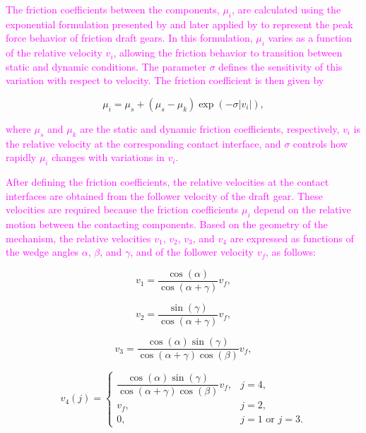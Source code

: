 \documentclass[preprint,10pt]{elsarticle}
\begin{document}
\textcolor{Magenta}{The friction coefficients between the components, $\mu_i$, are calculated using the exponential formulation presented by \cite{berger2002friction} and later applied by \cite{wu2014review} to represent the peak force behavior of friction draft gears. In this formulation, $\mu_i$ varies as a function of the relative velocity $v_i$, allowing the friction behavior to transition between static and dynamic conditions. The parameter $\sigma$ defines the sensitivity of this variation with respect to velocity. The friction coefficient is then given by}

\begin{equation}
\label{eq:friction_coefficient}
\mu_i
=
\mu_s
+
\left(\mu_s-\mu_k\right)
\exp\left(-\sigma |v_i|\right),
\end{equation}

\noindent \textcolor{Magenta}{where $\mu_s$ and $\mu_k$ are the static and dynamic friction coefficients, respectively, $v_i$ is the relative velocity at the corresponding contact interface, and $\sigma$ controls how rapidly $\mu_i$ changes with variations in $v_i$.}

\textcolor{Magenta}{After defining the friction coefficients, the relative velocities at the contact interfaces are obtained from the follower velocity of the draft gear. These velocities are required because the friction coefficients $\mu_i$ depend on the relative motion between the contacting components. Based on the geometry of the mechanism, the relative velocities $v_1$, $v_2$, $v_3$, and $v_4$ are expressed as functions of the wedge angles $\alpha$, $\beta$, and $\gamma$, and of the follower velocity $v_f$, as follows:}

\begin{equation}
\label{eq:relvel1}
v_1
=
\frac{\cos(\alpha)}
{\cos(\alpha+\gamma)}
v_f ,
\end{equation}

\begin{equation}
\label{eq:relvel2}
v_2
=
\frac{\sin(\gamma)}
{\cos(\alpha+\gamma)}
v_f ,
\end{equation}

\begin{equation}
\label{eq:relvel3}
v_3
=
\frac{\cos(\alpha)\sin(\gamma)}
{\cos(\alpha+\gamma)\cos(\beta)}
v_f ,
\end{equation}

\begin{equation}
\label{eq:relvel4}
v_4(j)
=
\begin{cases}
\dfrac{\cos(\alpha)\sin(\gamma)}
{\cos(\alpha+\gamma)\cos(\beta)}
v_f, & j=4,\\
v_f, & j=2,\\
0, & j=1 \text{ or } j=3.
\end{cases}
\end{equation}
\end{document}

